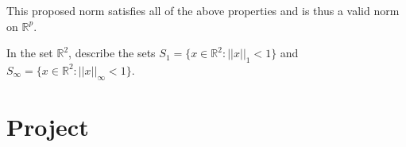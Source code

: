 \documentclass[12pt]{article}
\newenvironment{problem}[2][Problem]{\begin{trivlist}
\item[\hskip \labelsep {\bfseries #1}\hskip \labelsep {\bfseries #2.}]}{\end{trivlist}}
\begin{document}
This proposed norm satisfies all of the above properties and is thus a valid norm on $\mathbb{R}^p$.

\newpage

\begin{problem}{8.H} In the set $\mathbb{R}^2$, describe the sets $S_1 = \{x \in \mathbb{R}^2: ||x||_1 < 1\}$ and $S_{\infty} = \{x \in \mathbb{R}^2: ||x||_{\infty} < 1\}$.
\end{problem}

\newpage
\section{Project}
\end{document}
